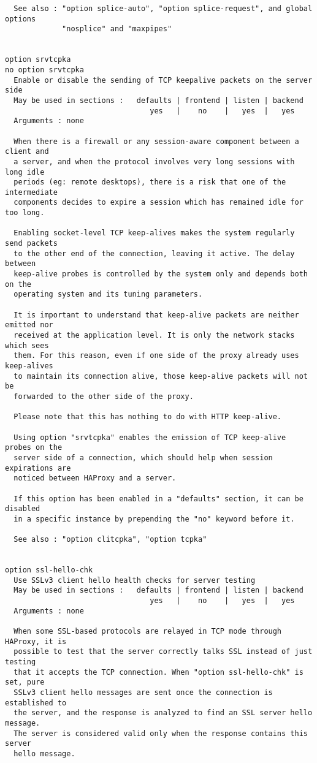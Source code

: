\begin{verbatim}
  See also : "option splice-auto", "option splice-request", and global options
             "nosplice" and "maxpipes"


option srvtcpka
no option srvtcpka
  Enable or disable the sending of TCP keepalive packets on the server side
  May be used in sections :   defaults | frontend | listen | backend
                                 yes   |    no    |   yes  |   yes
  Arguments : none

  When there is a firewall or any session-aware component between a client and
  a server, and when the protocol involves very long sessions with long idle
  periods (eg: remote desktops), there is a risk that one of the intermediate
  components decides to expire a session which has remained idle for too long.

  Enabling socket-level TCP keep-alives makes the system regularly send packets
  to the other end of the connection, leaving it active. The delay between
  keep-alive probes is controlled by the system only and depends both on the
  operating system and its tuning parameters.

  It is important to understand that keep-alive packets are neither emitted nor
  received at the application level. It is only the network stacks which sees
  them. For this reason, even if one side of the proxy already uses keep-alives
  to maintain its connection alive, those keep-alive packets will not be
  forwarded to the other side of the proxy.

  Please note that this has nothing to do with HTTP keep-alive.

  Using option "srvtcpka" enables the emission of TCP keep-alive probes on the
  server side of a connection, which should help when session expirations are
  noticed between HAProxy and a server.

  If this option has been enabled in a "defaults" section, it can be disabled
  in a specific instance by prepending the "no" keyword before it.

  See also : "option clitcpka", "option tcpka"


option ssl-hello-chk
  Use SSLv3 client hello health checks for server testing
  May be used in sections :   defaults | frontend | listen | backend
                                 yes   |    no    |   yes  |   yes
  Arguments : none

  When some SSL-based protocols are relayed in TCP mode through HAProxy, it is
  possible to test that the server correctly talks SSL instead of just testing
  that it accepts the TCP connection. When "option ssl-hello-chk" is set, pure
  SSLv3 client hello messages are sent once the connection is established to
  the server, and the response is analyzed to find an SSL server hello message.
  The server is considered valid only when the response contains this server
  hello message.


\end{verbatim}

